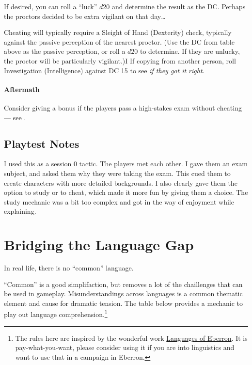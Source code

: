 \documentclass[twocolumn]{dndbook}
\begin{document}
If desired, you can roll a ``luck'' $d20$ and determine the result as the DC. Perhaps the proctors decided to be extra vigilant on that day\ldots\par

Cheating will typically require a Sleight of Hand (Dexterity) check, typically against the passive perception of the nearest proctor. (Use the DC from table above as the passive perception, or roll a $d20$ to determine. If they are unlucky, the proctor will be particularly vigilant.)I
If copying from another person, roll Investigation (Intelligence) against DC 15 to see \emph{if they got it right}.\par


\paragraph*{Aftermath}

Consider giving a bonus if the players pass a high-stakes exam without cheating --- see .

\subsection{Playtest Notes}

I used this as a session 0 tactic. The players met each other. I gave them an exam subject, and asked them why they were taking the exam. This cued them to create characters with more detailed backgrounds.
I also clearly gave them the option to study or to cheat, which made it more fun by giving them a choice. The study mechanic was a bit too complex and got in the way of enjoyment while explaining.\par


\section{Bridging the Language Gap}

\begin{emphasisParagraph}
	In real life, there is no ``common'' language.
\end{emphasisParagraph}


``Common'' is a good simplifaction, but removes a lot of the chaillenges that can be used in gameplay.
Misunderstandings across languages is a common thematic element and cause for dramatic tension.
The table below provides a mechanic to play out language comprehension.\footnote{The rules here are inspired by the wonderful work \href{https://www.dmsguild.com/product/262786/Languages-of-Eberron}{Languages of Eberron}.
It is pay-what-you-want, please consider using it if you are into linguistics and want to use that in a campaign in Eberron.}\par
\end{document}
